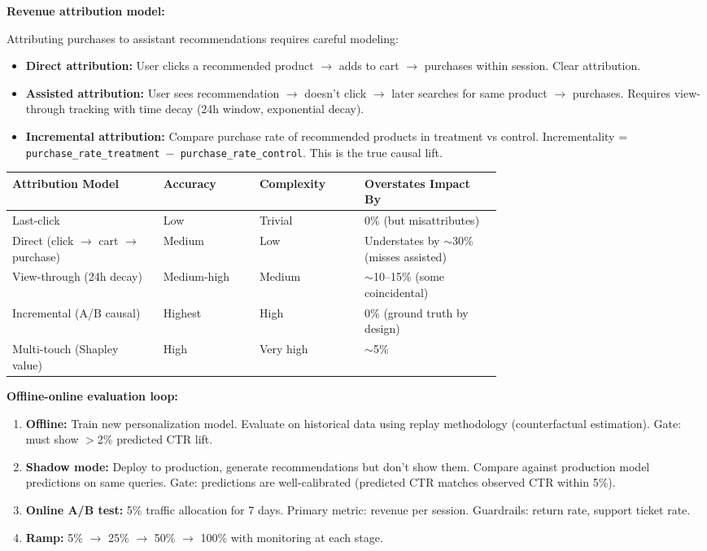 \textbf{Revenue attribution model:}

Attributing purchases to assistant recommendations requires careful modeling:

\begin{itemize}
  \item \textbf{Direct attribution:} User clicks a recommended product $\rightarrow$ adds to cart $\rightarrow$ purchases within session. Clear attribution.
  \item \textbf{Assisted attribution:} User sees recommendation $\rightarrow$ doesn't click $\rightarrow$ later searches for same product $\rightarrow$ purchases. Requires view-through tracking with time decay (24h window, exponential decay).
  \item \textbf{Incremental attribution:} Compare purchase rate of recommended products in treatment vs control. Incrementality = \texttt{purchase\_rate\_treatment $-$ purchase\_rate\_control}. This is the true causal lift.
\end{itemize}

\begin{tabular}{|p{0.22\linewidth}|p{0.14\linewidth}|p{0.14\linewidth}|p{0.20\linewidth}|}
\hline
\textbf{Attribution Model} & \textbf{Accuracy} & \textbf{Complexity} & \textbf{Overstates Impact By} \\
\hline
Last-click & Low & Trivial & 0\% (but misattributes) \\
\hline
Direct (click $\rightarrow$ cart $\rightarrow$ purchase) & Medium & Low & Understates by $\sim$30\% (misses assisted) \\
\hline
View-through (24h decay) & Medium-high & Medium & $\sim$10--15\% (some coincidental) \\
\hline
Incremental (A/B causal) & Highest & High & 0\% (ground truth by design) \\
\hline
Multi-touch (Shapley value) & High & Very high & $\sim$5\% \\
\hline
\end{tabular}

\textbf{Offline-online evaluation loop:}

\begin{enumerate}
  \item \textbf{Offline:} Train new personalization model. Evaluate on historical data using replay methodology (counterfactual estimation). Gate: must show $>$2\% predicted CTR lift.
  \item \textbf{Shadow mode:} Deploy to production, generate recommendations but don't show them. Compare against production model predictions on same queries. Gate: predictions are well-calibrated (predicted CTR matches observed CTR within 5\%).
  \item \textbf{Online A/B test:} 5\% traffic allocation for 7 days. Primary metric: revenue per session. Guardrails: return rate, support ticket rate.
  \item \textbf{Ramp:} 5\% $\rightarrow$ 25\% $\rightarrow$ 50\% $\rightarrow$ 100\% with monitoring at each stage.
\end{enumerate}

